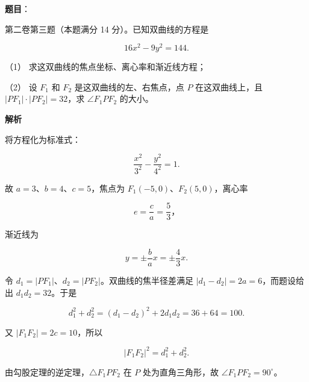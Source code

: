 \begin{answer}

\textbf{题目}：

第二卷第三题（本题满分 14 分）。已知双曲线的方程是

\nopagebreak[4]
\[
16x^2-9y^2=144.
\]

（1） 求这双曲线的焦点坐标、离心率和渐近线方程；

（2） 设 $F_1$ 和 $F_2$ 是这双曲线的左、右焦点，点 $P$ 在这双曲线上，且 $|PF_1|\cdot|PF_2|=32$，求 $\angle F_1PF_2$ 的大小。

\textbf{解析}


将方程化为标准式：

\nopagebreak[4]
\[
\frac{x^2}{3^2}-\frac{y^2}{4^2}=1.
\]

故 $a=3$、$b=4$、$c=5$，焦点为 $F_1(-5,0)$、$F_2(5,0)$，离心率

\nopagebreak[4]
\[
e=\frac ca=\frac53\text{，}
\]

渐近线为

\nopagebreak[4]
\[
y=\pm\frac ba x=\pm\frac43x.
\]


令 $d_1=|PF_1|$、$d_2=|PF_2|$。双曲线的焦半径差满足 $|d_1-d_2|=2a=6$，而题设给出 $d_1d_2=32$。于是

\nopagebreak[4]
\[
d_1^2+d_2^2=(d_1-d_2)^2+2d_1d_2=36+64=100.
\]

又 $|F_1F_2|=2c=10$，所以

\nopagebreak[4]
\[
|F_1F_2|^2=d_1^2+d_2^2.
\]

由勾股定理的逆定理，$\triangle F_1PF_2$ 在 $P$ 处为直角三角形，故 $\angle F_1PF_2=90^\circ$。



\end{answer}
